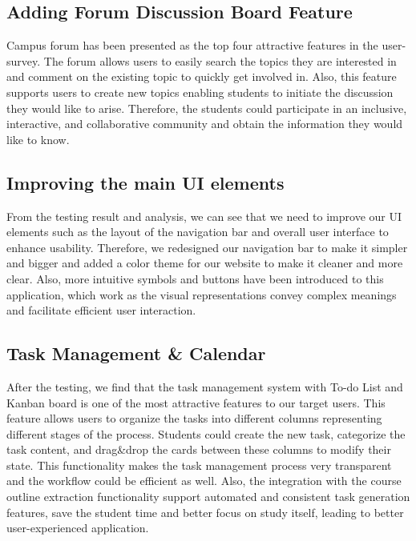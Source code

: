 \documentclass[12pt, titlepage]{article}
\begin{document}
\subsection{Adding Forum Discussion Board Feature}\label{FDBD}

 Campus forum has been presented as the top four attractive features in the user-survey. The forum allows users to easily search the topics they are interested in and comment on the existing topic to quickly get involved in. Also, this feature supports users to create new topics enabling students to initiate the discussion they would like to arise. Therefore, the students could participate in an inclusive,  interactive, and collaborative community and obtain the information they would like to know. 
 
\subsection{Improving the main UI elements}\label{IMUI}
From the testing result and analysis, we can see that we need to improve our UI elements such as the layout of the navigation bar and overall user interface to enhance usability. Therefore, we redesigned our navigation bar to make it simpler and bigger and added a color theme for our website to make it cleaner and more clear. Also, more intuitive symbols and buttons have been introduced to this application, which work as the visual representations convey complex meanings and facilitate efficient user interaction.

 \subsection{Task Management \& Calendar} \label{TMCR}
  After the testing, we find that the task management system with To-do List and Kanban board is one  of the most attractive features to our target users. This feature allows users to organize the tasks into different columns representing different stages of the process. Students could create the new task, categorize the task content, and drag&drop the cards between these columns to modify their state. This functionality makes the task management process very transparent and the workflow could be efficient as well. Also, the integration with the course outline extraction functionality support  automated and consistent task generation features, save the student time and better focus on study itself, leading to better user-experienced application.
\end{document}
